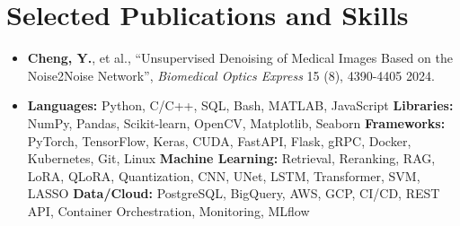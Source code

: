 \documentclass[letterpaper,10pt]{article}
\begin{document}
\vspace*{-10pt}
\vspace*{-3pt}
\section{Selected Publications and Skills}
\begin{itemize}[leftmargin=0.2in]
  \item \small \textbf{Cheng, Y.}, et al., ``Unsupervised Denoising of Medical Images Based on the Noise2Noise Network'', \textit{Biomedical Optics Express} 15 (8), 4390-4405 2024.
    \item  \noindent \small
\textbf {Languages:} Python, C/C++, SQL, Bash, MATLAB, JavaScript  \textbf{Libraries:} NumPy, Pandas, Scikit-learn, OpenCV, Matplotlib, Seaborn \textbf{Frameworks:} PyTorch, TensorFlow, Keras, CUDA, FastAPI, Flask, gRPC, Docker, Kubernetes, Git, Linux \textbf{Machine Learning:} Retrieval, Reranking, RAG, LoRA, QLoRA, Quantization, CNN, UNet, LSTM, Transformer, SVM, LASSO \textbf{Data/Cloud:} PostgreSQL, BigQuery, AWS, GCP, CI/CD, REST API, Container Orchestration, Monitoring, MLflow
\end{itemize}



\vspace*{-10pt}
\vspace*{-3pt}
\end{document}
